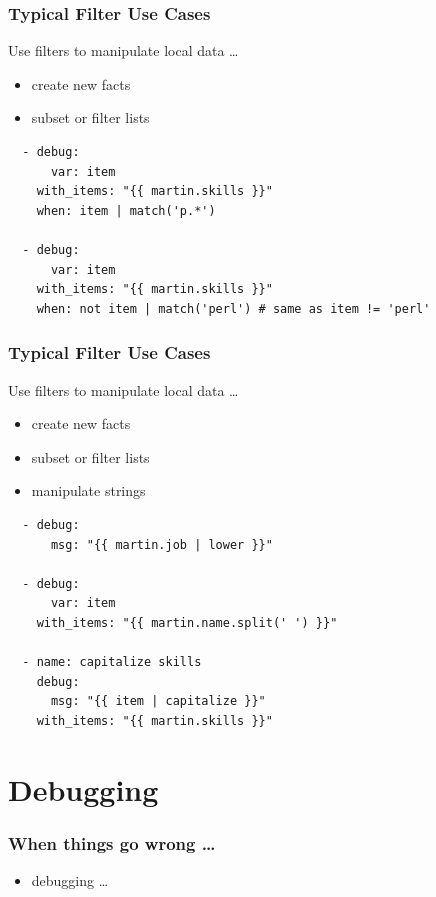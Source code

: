 \documentclass[pdf]{beamer}
\begin{document}
\begin{frame}[fragile]
  \frametitle{Typical Filter Use Cases}
  Use filters to manipulate local data \ldots
  \begin{itemize}
    \item {create new facts}
    \item \alert<1>{subset or filter lists}
  \end{itemize}
  \begin{lstlisting}
  - debug:
      var: item
    with_items: "{{ martin.skills }}"
    when: item | match('p.*')

  - debug:
      var: item
    with_items: "{{ martin.skills }}"
    when: not item | match('perl') # same as item != 'perl'
  \end{lstlisting}
\end{frame}

\begin{frame}[fragile]
  \frametitle{Typical Filter Use Cases}
  Use filters to manipulate local data \ldots
  \begin{itemize}
    \item {create new facts}
    \item {subset or filter lists}
    \item \alert<1>{manipulate strings} 
  \end{itemize}
  \begin{lstlisting}
  - debug:
      msg: "{{ martin.job | lower }}"

  - debug:
      var: item
    with_items: "{{ martin.name.split(' ') }}"

  - name: capitalize skills
    debug:
      msg: "{{ item | capitalize }}"
    with_items: "{{ martin.skills }}"
  \end{lstlisting}
\end{frame}

\section{Debugging}

\begin{frame}
  \frametitle{When things go wrong \ldots}
  \begin{itemize}
    \item{debugging \ldots}
  \end{itemize}
\end{frame}
\end{document}

